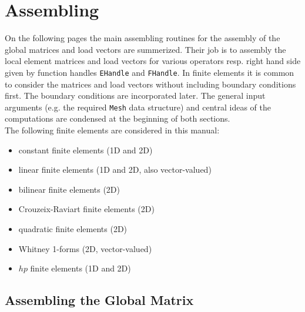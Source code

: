 
\chapter{Assembling} \label{chap:assem}


 On the following pages the main assembling routines for the assembly of the global matrices and load vectors are summerized. Their job is to assembly the local element matrices and load vectors for various operators resp. right hand side given by function handles {\tt EHandle} and {\tt FHandle}. In finite elements it is common to consider the matrices and load vectors without including boundary conditions first. The boundary conditions are incorporated later.  The general input arguments (e.g. the required {\tt Mesh} data structure) and central ideas of the computations are condensed at the beginning of both sections. \\

 The following finite elements are considered in this manual:
\begin{itemize}
	\item constant finite elements (1D and 2D)
	\item linear finite elements (1D and 2D, also vector-valued)
	\item bilinear finite elements (2D)
	\item Crouzeix-Raviart finite elements (2D)
	\item quadratic finite elements (2D)
	\item Whitney 1-forms (2D, vector-valued)
	\item $hp$ finite elements (1D and 2D)
\end{itemize}




\section{Assembling the Global Matrix} \label{sect:assem_mat} 

